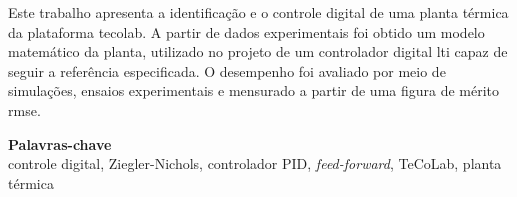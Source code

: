 \begin{resumo}
Este trabalho apresenta a identificação e o controle digital de uma planta
térmica da plataforma \gls{tecolab}. A partir de dados experimentais foi obtido
um modelo matemático da planta, utilizado no projeto de um controlador digital
\gls{lti} capaz de seguir a referência especificada. O desempenho foi avaliado
por meio de simulações, ensaios experimentais e mensurado a partir de uma figura
de mérito \gls{rmse}.
\end{resumo}
{\small
\begin{center}
{\bfseries Palavras-chave}\\
controle digital, Ziegler-Nichols, controlador PID, \textit{feed-forward}, TeCoLab, planta térmica
\end{center}
}